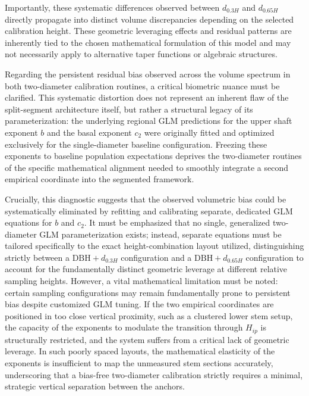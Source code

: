 \documentclass[twocolumn, bibliography=totoc]{scrartcl}
\begin{document}
Importantly, these systematic differences observed between $d_{0.3H}$ and $d_{0.65H}$ directly propagate into distinct volume discrepancies depending on the selected calibration height. These geometric leveraging effects and residual patterns are inherently tied to the chosen mathematical formulation of this model and may not necessarily apply to alternative taper functions or algebraic structures.

Regarding the persistent residual bias observed across the volume spectrum in both two-diameter calibration routines, a critical biometric nuance must be clarified. This systematic distortion does not represent an inherent flaw of the split-segment architecture itself, but rather a structural legacy of its parameterization: the underlying regional GLM predictions for the upper shaft exponent $b$ and the basal exponent $c_2$ were originally fitted and optimized exclusively for the single-diameter baseline configuration. Freezing these exponents to baseline population expectations deprives the two-diameter routines of the specific mathematical alignment needed to smoothly integrate a second empirical coordinate into the segmented framework. 

Crucially, this diagnostic suggests that the observed volumetric bias could be systematically eliminated by refitting and calibrating separate, dedicated GLM equations for $b$ and $c_2$. It must be emphasized that no single, generalized two-diameter GLM parameterization exists; instead, separate equations must be tailored specifically to the exact height-combination layout utilized, distinguishing strictly between a $\text{DBH}+d_{0.3H}$ configuration and a $\text{DBH}+d_{0.65H}$ configuration to account for the fundamentally distinct geometric leverage at different relative sampling heights. However, a vital mathematical limitation must be noted: certain sampling configurations may remain fundamentally prone to persistent bias despite customized GLM tuning. If the two empirical coordinates are positioned in too close vertical proximity, such as a clustered lower stem setup, the capacity of the exponents to modulate the transition through $H_{ip}$ is structurally restricted, and the system suffers from a critical lack of geometric leverage. In such poorly spaced layouts, the mathematical elasticity of the exponents is insufficient to map the unmeasured stem sections accurately, underscoring that a bias-free two-diameter calibration strictly requires a minimal, strategic vertical separation between the anchors.
\end{document}
